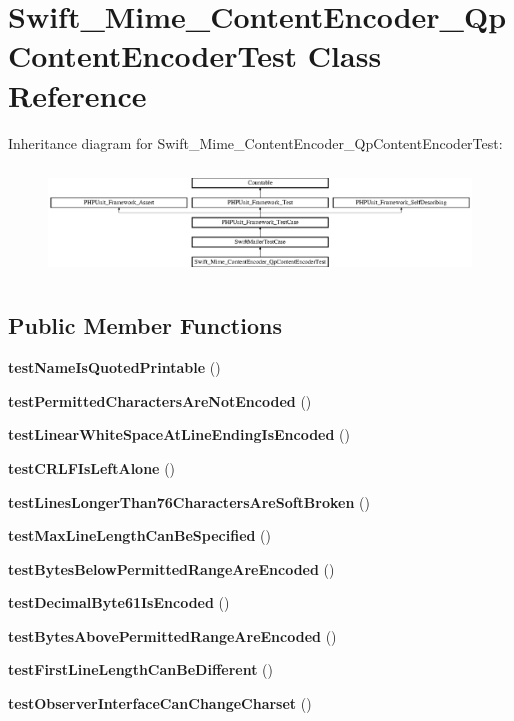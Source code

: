 \section{Swift\+\_\+\+Mime\+\_\+\+Content\+Encoder\+\_\+\+Qp\+Content\+Encoder\+Test Class Reference}
\label{class_swift___mime___content_encoder___qp_content_encoder_test}
Inheritance diagram for Swift\+\_\+\+Mime\+\_\+\+Content\+Encoder\+\_\+\+Qp\+Content\+Encoder\+Test\+:\begin{figure}[H]
\begin{center}
\leavevmode
\includegraphics[height=2.916667cm]{class_swift___mime___content_encoder___qp_content_encoder_test}
\end{center}
\end{figure}
\subsection*{Public Member Functions}
\begin{DoxyCompactItemize}
\item 
{\bf test\+Name\+Is\+Quoted\+Printable} ()
\item 
{\bf test\+Permitted\+Characters\+Are\+Not\+Encoded} ()
\item 
{\bf test\+Linear\+White\+Space\+At\+Line\+Ending\+Is\+Encoded} ()
\item 
{\bf test\+C\+R\+L\+F\+Is\+Left\+Alone} ()
\item 
{\bf test\+Lines\+Longer\+Than76\+Characters\+Are\+Soft\+Broken} ()
\item 
{\bf test\+Max\+Line\+Length\+Can\+Be\+Specified} ()
\item 
{\bf test\+Bytes\+Below\+Permitted\+Range\+Are\+Encoded} ()
\item 
{\bf test\+Decimal\+Byte61\+Is\+Encoded} ()
\item 
{\bf test\+Bytes\+Above\+Permitted\+Range\+Are\+Encoded} ()
\item 
{\bf test\+First\+Line\+Length\+Can\+Be\+Different} ()
\item 
{\bf test\+Observer\+Interface\+Can\+Change\+Charset} ()
\end{DoxyCompactItemize}
